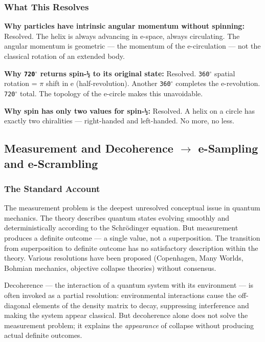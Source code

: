 \documentclass[aps,prd,preprint,superscriptaddress,longbibliography,floatfix]{revtex4-2}
\theoremstyle{remark}
\begin{document}
\subsubsection{What This Resolves}

\textbf{Why particles have intrinsic angular momentum without spinning:} Resolved. The helix is always advancing in e-space, always circulating. The angular momentum is geometric --- the momentum of the e-circulation --- not the classical rotation of an extended body.

\textbf{Why \texttt{720$^{\circ}$} returns spin-\texttt{½} to its original state:} Resolved. \texttt{360$^{\circ}$} spatial rotation = $\pi$ shift in e (half-revolution). Another \texttt{360$^{\circ}$} completes the e-revolution. \texttt{720$^{\circ}$} total. The topology of the e-circle makes this unavoidable.

\textbf{Why spin has only two values for spin-\texttt{½}:} Resolved. A helix on a circle has exactly two chiralities --- right-handed and left-handed. No more, no less.



\subsection{Measurement and Decoherence $\to$ e-Sampling and e-Scrambling}


\subsubsection{The Standard Account}

The measurement problem is the deepest unresolved conceptual issue in quantum mechanics. The theory describes quantum states evolving smoothly and deterministically according to the Schr\"{o}dinger equation. But measurement produces a definite outcome --- a single value, not a superposition. The transition from superposition to definite outcome has no satisfactory description within the theory. Various resolutions have been proposed (Copenhagen, Many Worlds, Bohmian mechanics, objective collapse theories) without consensus.

Decoherence --- the interaction of a quantum system with its environment --- is often invoked as a partial resolution: environmental interactions cause the off-diagonal elements of the density matrix to decay, suppressing interference and making the system appear classical. But decoherence alone does not solve the measurement problem; it explains the \textit{appearance} of collapse without producing actual definite outcomes.
\end{document}
